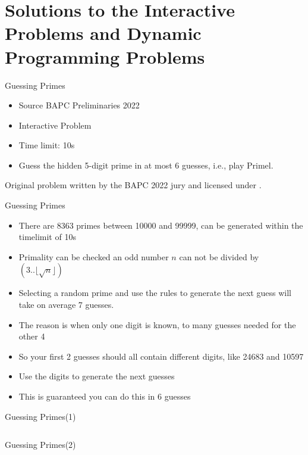 \documentclass[11pt,pdf, aspectratio=169]{beamer}
\begin{document}
  \section{Solutions to the Interactive Problems and Dynamic Programming Problems}
  \begin{frame}{Guessing Primes}
    \begin{itemize}
      \item Source BAPC Preliminaries 2022
      \item Interactive Problem
      \item Time limit: 10s
      \item Guess the hidden 5-digit prime in at most 6 guesses, i.e., play Primel.

    \end{itemize}
    Original problem written by the BAPC 2022 jury and licensed under \doclicenseLongNameRef.

    \doclicenseImage
  \end{frame}
  \begin{frame}{Guessing Primes}
    \begin{itemize}
      \item There are 8363 primes between 10000 and 99999, can be generated within the timelimit of 10s
      \item Primality can be checked an odd number $n$ can not be divided by $(3..\lfloor\sqrt{n}\rfloor)$
      \item Selecting a random prime and use the rules to generate the next guess will take on average 7 guesses.
      \item The reason is when only one digit is known, to many guesses needed for the other 4
      \item So your first 2 guesses should all contain different digits, like 24683 and 10597
      \item Use the digits to generate the next guesses
      \item This is guaranteed you can do this in 6 guesses
    \end{itemize}
  \end{frame}
  \begin{frame}[containsverbatim]{Guessing Primes(1)}
    \inputminted[fontsize=\tiny]{python}{code/session-4/dapc-g-1.py}
  \end{frame}
  \begin{frame}[containsverbatim]{Guessing Primes(2)}
    \inputminted[fontsize=\tiny]{python}{code/session-4/dapc-g-2.py}
  \end{frame}
\end{document}

